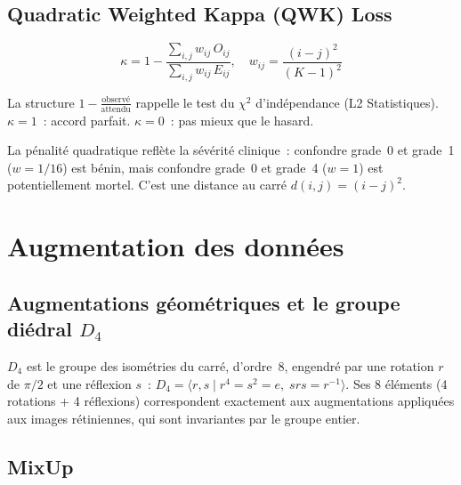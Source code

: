 \documentclass[11pt,a4paper]{article}
\begin{document}
\subsection{Quadratic Weighted Kappa (QWK) Loss}

\begin{equation}
  \kappa = 1 - \frac{\sum_{i,j} w_{ij}\,O_{ij}}{\sum_{i,j} w_{ij}\,E_{ij}}, \quad w_{ij} = \frac{(i-j)^2}{(K-1)^2}
\end{equation}

\begin{intubox}
La structure $1 - \frac{\text{observ\'e}}{\text{attendu}}$ rappelle le test du $\chi^2$ d'ind\'ependance (L2 Statistiques). $\kappa = 1$~: accord parfait. $\kappa = 0$~: pas mieux que le hasard.

La p\'enalit\'e quadratique refl\`ete la s\'ev\'erit\'e clinique~: confondre grade~0 et grade~1 ($w = 1/16$) est b\'enin, mais confondre grade~0 et grade~4 ($w = 1$) est potentiellement mortel. C'est une distance au carr\'e $d(i,j) = (i-j)^2$.
\end{intubox}

\section{Augmentation des donn\'ees}

\subsection{Augmentations g\'eom\'etriques et le groupe di\'edral $D_4$}

\begin{rappelbox}
$D_4$ est le groupe des isom\'etries du carr\'e, d'ordre~8, engendr\'e par une rotation $r$ de $\pi/2$ et une r\'eflexion $s$~: $D_4 = \langle r, s \mid r^4 = s^2 = e,\; srs = r^{-1} \rangle$. Ses 8 \'el\'ements (4 rotations + 4 r\'eflexions) correspondent exactement aux augmentations appliqu\'ees aux images r\'etiniennes, qui sont invariantes par le groupe entier.
\end{rappelbox}

\subsection{MixUp}
\end{document}
